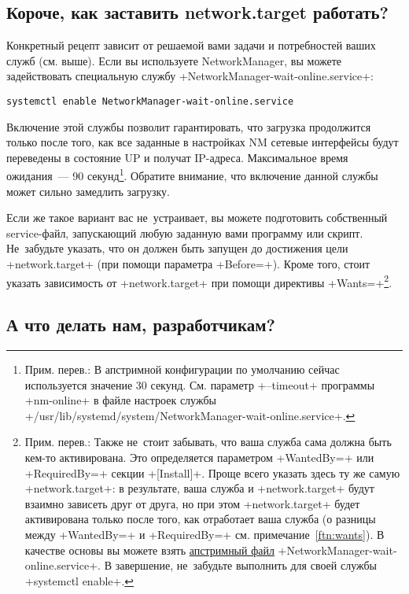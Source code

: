 \documentclass[10pt,oneside,a4paper]{article}
\begin{document}
\subsection*{Короче, как заставить network.target работать?}

Конкретный рецепт зависит от решаемой вами задачи и потребностей ваших служб
(см. выше). Если вы используете NetworkManager, вы можете задействовать
специальную службу +NetworkManager-wait-online.service+:
\begin{Verbatim}
systemctl enable NetworkManager-wait-online.service
\end{Verbatim}

Включение этой службы позволит гарантировать, что загрузка продолжится только
после того, как все заданные в настройках NM сетевые интерфейсы будут переведены
в состояние UP и получат IP-адреса. Максимальное время ожидания~--- 90
секунд\footnote{Прим. перев.: В апстримной конфигурации по умолчанию сейчас
используется значение 30 секунд. См. параметр +--timeout+ программы +nm-online+
в файле настроек службы 
+/usr/lib/systemd/system/NetworkManager-wait-online.service+.}.
Обратите внимание, что включение данной службы может сильно замедлить загрузку.

Если же такое вариант вас не~устраивает, вы можете подготовить собственный
service-файл, запускающий любую заданную вами программу или скрипт. Не~забудьте
указать, что он должен быть запущен до достижения цели +network.target+ (при
помощи параметра +Before=+). Кроме того, стоит указать зависимость от
+network.target+ при помощи директивы +Wants=+\footnote{Прим. перев.: Также
не~стоит забывать, что ваша служба сама должна быть кем-то активирована. Это
определяется параметром +WantedBy=+ или +RequiredBy=+ секции +[Install]+. Проще
всего указать здесь ту же самую +network.target+: в результате, ваша служба и
+network.target+ будут взаимно зависеть друг от друга, но при этом
+network.target+ будет активирована только после того, как отработает ваша
служба (о разницы между +WantedBy=+ и +RequiredBy=+ см.
примечание~\ref{ftn:wants}). В качестве основы вы можете взять
\href{http://cgit.freedesktop.org/NetworkManager/NetworkManager/tree/data/NetworkManager-wait-online.service.in}%
{апстримный файл} +NetworkManager-wait-online.service+. В завершение,
не~забудьте выполнить для своей службы +systemctl enable+.}.

\subsection*{А что делать нам, разработчикам?}
\end{document}
